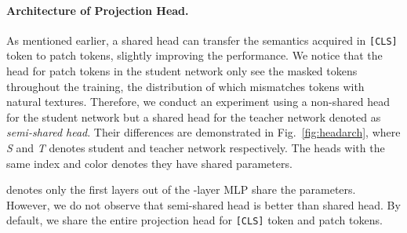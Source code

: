 \documentclass{article} \usepackage{iclr2022_conference,times}
\begin{document}
\paragraph{Architecture of Projection Head.} 
As mentioned earlier, a shared head can transfer the semantics acquired in \texttt{[CLS]} token to patch tokens, slightly improving the performance. 
We notice that the head for patch tokens in the student network only see the masked tokens throughout the training, the distribution of which mismatches tokens with natural textures. 
Therefore, we conduct an experiment using a non-shared head for the student network but a shared head for the teacher network denoted as \textit{semi-shared head}. 
Their differences are demonstrated in Fig.~\ref{fig:headarch}, where \textit{S} and \textit{T} denotes student and teacher network respectively. The heads with the same index and color denotes they have shared parameters. 
\vspace{-0.3cm}
\begin{table}[H]
\centering
{}
\end{table}
\vspace{-0.7cm}
 denotes only the first  layers out of the -layer MLP share the parameters. However, we do not observe that semi-shared head is better than shared head. By default, we share the entire projection head for \texttt{[CLS]} token and patch tokens.
\end{document}
